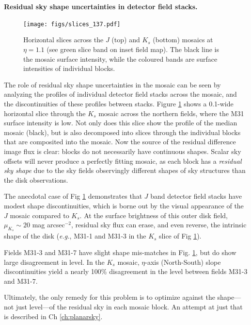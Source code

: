 \documentclass[iop]{emulateapj}
\newcommand{\eg}{\textit{e.g.}}
\begin{document}
\paragraph{Residual sky shape uncertainties in detector field stacks.}

\begin{figure}[t]
    \centering
        \texttt{[image: figs/slices\_137.pdf]}
    \caption[Horizontal slices across the $J$ and $K_s$ mosaics at $\eta=1.1$]{Horizontal slices across the $J$ (top) and $K_s$ (bottom) mosaics at $\eta=1.1$ (see green slice band on inset field map). The black line is the mosaic surface intensity, while the coloured bands are surface intensities of individual blocks.}
    \label{fig:slices_137}
\end{figure}

The role of residual sky shape uncertainties in the mosaic can be seen by analyzing the profiles of individual detector field stacks across the mosaic, and the discontinuities of these profiles between stacks. Figure \ref{fig:slices_137} shows a 0.1\arcdeg -wide horizontal slice through the $K_s$ mosaic across the northern fields, where the M31 surface intensity is low. Not only does this slice show the profile of the median mosaic (black), but is also decomposed into slices through the individual blocks that are composited into the mosaic. Now the source of the residual difference image flux is clear: blocks do not necessarily have continuous shapes. Scalar sky offsets will never produce a perfectly fitting mosaic, as each block has a \emph{residual sky shape} due to the sky fields observingly different shapes of sky structures than the disk observations.

The anecdotal case of Fig \ref{fig:slices_137} demonstrates that $J$ band detector field stacks have modest shape discontinuities, which is borne out by the visual appearance of the $J$ mosaic compared to $K_s$. At the surface brightness of this outer disk field, $\mu_{K_s}\sim 20$ mag arcsec$^{-2}$, residual sky flux can erase, and even reverse, the intrinsic shape of the disk (\eg, M31-1 and M31-3 in the $K_s$ slice of Fig \ref{fig:slices_137}).

Fields M31-3 and M31-7 have slight shape mis-matches in Fig. \ref{fig:slices_137}, but do show large disagreement in level. In the $K_s$ mosaic, $\eta$-axis (North-South) slope discontinuities yield a nearly 100\% disagreement in the level between fields M31-3 and M31-7.

Ultimately, the only remedy for this problem is to optimize against the shape---not just level---of the residual sky in each mosaic block. An attempt at just that is described in Ch \ref{ch:planarsky}.

\end{document}
